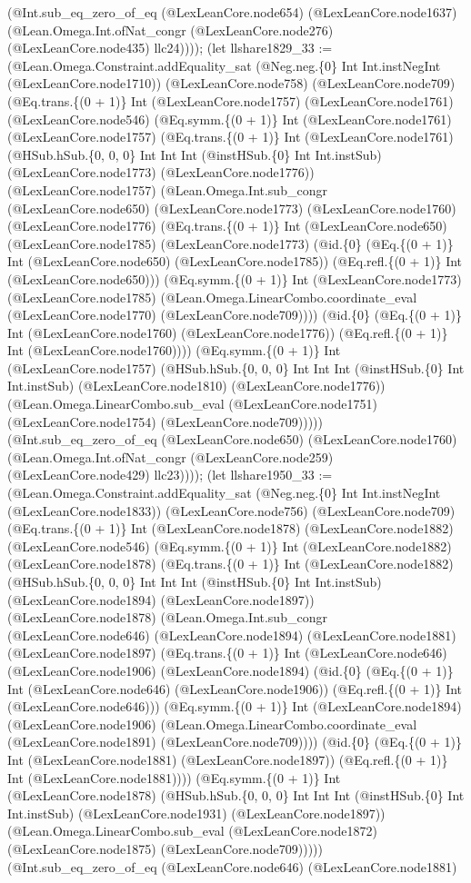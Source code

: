 \documentclass[11pt]{article}
\begin{document}
(@Int.sub\_eq\_zero\_of\_eq (@LexLeanCore.node654) (@LexLeanCore.node1637) (@Lean.Omega.Int.ofNat\_congr (@LexLeanCore.node276) (@LexLeanCore.node435) llc24)))); (let llshare1829\_33 := (@Lean.Omega.Constraint.addEquality\_sat (@Neg.neg.\{0\} Int Int.instNegInt (@LexLeanCore.node1710)) (@LexLeanCore.node758) (@LexLeanCore.node709) (@Eq.trans.\{(0 + 1)\} Int (@LexLeanCore.node1757) (@LexLeanCore.node1761) (@LexLeanCore.node546) (@Eq.symm.\{(0 + 1)\} Int (@LexLeanCore.node1761) (@LexLeanCore.node1757) (@Eq.trans.\{(0 + 1)\} Int (@LexLeanCore.node1761) (@HSub.hSub.\{0, 0, 0\} Int Int Int (@instHSub.\{0\} Int Int.instSub) (@LexLeanCore.node1773) (@LexLeanCore.node1776)) (@LexLeanCore.node1757) (@Lean.Omega.Int.sub\_congr (@LexLeanCore.node650) (@LexLeanCore.node1773) (@LexLeanCore.node1760) (@LexLeanCore.node1776) (@Eq.trans.\{(0 + 1)\} Int (@LexLeanCore.node650) (@LexLeanCore.node1785) (@LexLeanCore.node1773) (@id.\{0\} (@Eq.\{(0 + 1)\} Int (@LexLeanCore.node650) (@LexLeanCore.node1785)) (@Eq.refl.\{(0 + 1)\} Int (@LexLeanCore.node650))) (@Eq.symm.\{(0 + 1)\} Int (@LexLeanCore.node1773) (@LexLeanCore.node1785) (@Lean.Omega.LinearCombo.coordinate\_eval (@LexLeanCore.node1770) (@LexLeanCore.node709)))) (@id.\{0\} (@Eq.\{(0 + 1)\} Int (@LexLeanCore.node1760) (@LexLeanCore.node1776)) (@Eq.refl.\{(0 + 1)\} Int (@LexLeanCore.node1760)))) (@Eq.symm.\{(0 + 1)\} Int (@LexLeanCore.node1757) (@HSub.hSub.\{0, 0, 0\} Int Int Int (@instHSub.\{0\} Int Int.instSub) (@LexLeanCore.node1810) (@LexLeanCore.node1776)) (@Lean.Omega.LinearCombo.sub\_eval (@LexLeanCore.node1751) (@LexLeanCore.node1754) (@LexLeanCore.node709))))) (@Int.sub\_eq\_zero\_of\_eq (@LexLeanCore.node650) (@LexLeanCore.node1760) (@Lean.Omega.Int.ofNat\_congr (@LexLeanCore.node259) (@LexLeanCore.node429) llc23)))); (let llshare1950\_33 := (@Lean.Omega.Constraint.addEquality\_sat (@Neg.neg.\{0\} Int Int.instNegInt (@LexLeanCore.node1833)) (@LexLeanCore.node756) (@LexLeanCore.node709) (@Eq.trans.\{(0 + 1)\} Int (@LexLeanCore.node1878) (@LexLeanCore.node1882) (@LexLeanCore.node546) (@Eq.symm.\{(0 + 1)\} Int (@LexLeanCore.node1882) (@LexLeanCore.node1878) (@Eq.trans.\{(0 + 1)\} Int (@LexLeanCore.node1882) (@HSub.hSub.\{0, 0, 0\} Int Int Int (@instHSub.\{0\} Int Int.instSub) (@LexLeanCore.node1894) (@LexLeanCore.node1897)) (@LexLeanCore.node1878) (@Lean.Omega.Int.sub\_congr (@LexLeanCore.node646) (@LexLeanCore.node1894) (@LexLeanCore.node1881) (@LexLeanCore.node1897) (@Eq.trans.\{(0 + 1)\} Int (@LexLeanCore.node646) (@LexLeanCore.node1906) (@LexLeanCore.node1894) (@id.\{0\} (@Eq.\{(0 + 1)\} Int (@LexLeanCore.node646) (@LexLeanCore.node1906)) (@Eq.refl.\{(0 + 1)\} Int (@LexLeanCore.node646))) (@Eq.symm.\{(0 + 1)\} Int (@LexLeanCore.node1894) (@LexLeanCore.node1906) (@Lean.Omega.LinearCombo.coordinate\_eval (@LexLeanCore.node1891) (@LexLeanCore.node709)))) (@id.\{0\} (@Eq.\{(0 + 1)\} Int (@LexLeanCore.node1881) (@LexLeanCore.node1897)) (@Eq.refl.\{(0 + 1)\} Int (@LexLeanCore.node1881)))) (@Eq.symm.\{(0 + 1)\} Int (@LexLeanCore.node1878) (@HSub.hSub.\{0, 0, 0\} Int Int Int (@instHSub.\{0\} Int Int.instSub) (@LexLeanCore.node1931) (@LexLeanCore.node1897)) (@Lean.Omega.LinearCombo.sub\_eval (@LexLeanCore.node1872) (@LexLeanCore.node1875) (@LexLeanCore.node709))))) (@Int.sub\_eq\_zero\_of\_eq (@LexLeanCore.node646) (@LexLeanCore.node1881) 
\end{document}
